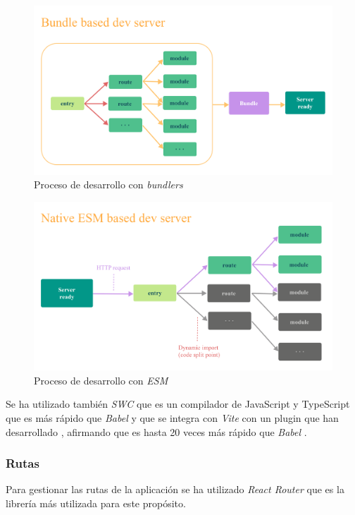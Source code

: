 \begin{figure}[H]
  \centering
  \includegraphics[width=1\textwidth]{img/bundle-based}
  \caption{Proceso de desarrollo con \textit{bundlers}}
  \label{fig:vite-bundle}
\end{figure}

\begin{figure}[H]
  \centering
  \includegraphics[width=1\textwidth]{img/esm-based}
  \caption{Proceso de desarrollo con \textit{ESM}}
  \label{fig:vite-esm}
\end{figure}

Se ha utilizado también \textit{SWC} \cite{swc} que es un compilador de JavaScript y
TypeScript que es más rápido que \textit{Babel} \cite{babel} y que se integra con
\textit{Vite} \cite{vite} con un plugin que han desarrollado \cite{vite-swc}, afirmando
que es hasta 20 veces más rápido que \textit{Babel} \cite{babel}.

\subsubsection{Rutas}
Para gestionar las rutas de la aplicación se ha utilizado \textit{React Router}
\cite{react-router} que es la librería más utilizada para este propósito.

